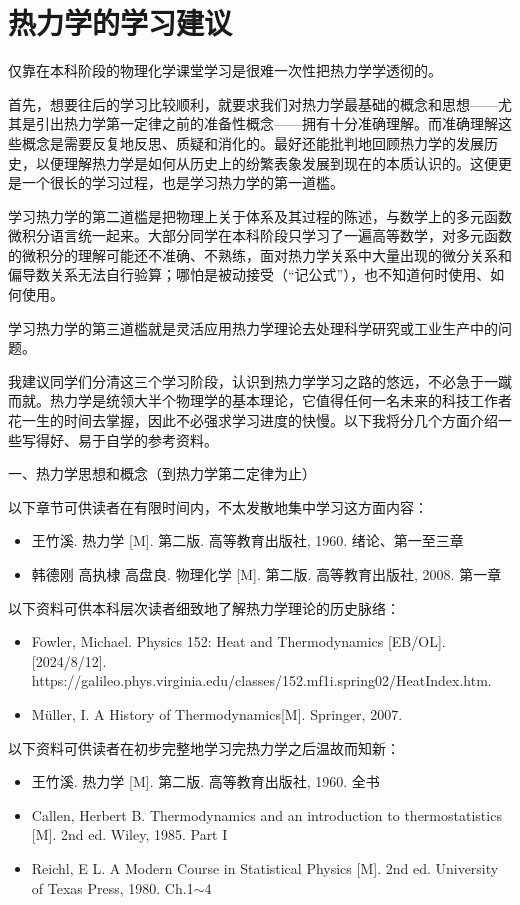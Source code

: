 \documentclass[main.tex]{subfiles}
\begin{document}
\section{热力学的学习建议}\label{I.1 learning_advices}
仅靠在本科阶段的物理化学课堂学习是很难一次性把热力学学透彻的。

首先，想要往后的学习比较顺利，就要求我们对热力学最基础的概念和思想——尤其是引出热力学第一定律之前的准备性概念——拥有十分准确理解。而准确理解这些概念是需要反复地反思、质疑和消化的。最好还能批判地回顾热力学的发展历史，以便理解热力学是如何从历史上的纷繁表象发展到现在的本质认识的。这便更是一个很长的学习过程，也是学习热力学的第一道槛。

学习热力学的第二道槛是把物理上关于体系及其过程的陈述，与数学上的多元函数微积分语言统一起来。大部分同学在本科阶段只学习了一遍高等数学，对多元函数的微积分的理解可能还不准确、不熟练，面对热力学关系中大量出现的微分关系和偏导数关系无法自行验算；哪怕是被动接受（“记公式”），也不知道何时使用、如何使用。

学习热力学的第三道槛就是灵活应用热力学理论去处理科学研究或工业生产中的问题。

我建议同学们分清这三个学习阶段，认识到热力学学习之路的悠远，不必急于一蹴而就。热力学是统领大半个物理学的基本理论，它值得任何一名未来的科技工作者花一生的时间去掌握，因此不必强求学习进度的快慢。以下我将分几个方面介绍一些写得好、易于自学的参考资料。

一、热力学思想和概念（到热力学第二定律为止）

以下章节可供读者在有限时间内，不太发散地集中学习这方面内容：
\begin{itemize}
  \item 王竹溪. 热力学 [M]. 第二版. 高等教育出版社, 1960. 绪论、第一至三章
  \item 韩德刚 高执棣 高盘良. 物理化学 [M]. 第二版. 高等教育出版社, 2008. 第一章
\end{itemize}
以下资料可供本科层次读者细致地了解热力学理论的历史脉络：
\begin{itemize}
  \item Fowler, Michael. Physics 152: Heat and Thermodynamics [EB/OL]. [2024/8/12]. \\https://galileo.phys.virginia.edu/classes/152.mf1i.spring02/HeatIndex.htm.
  \item Müller, I. A History of Thermodynamics[M]. Springer, 2007.
\end{itemize}
以下资料可供读者在初步完整地学习完热力学之后温故而知新：
\begin{itemize}
  \item 王竹溪. 热力学 [M]. 第二版. 高等教育出版社, 1960. 全书
  \item Callen, Herbert B. Thermodynamics and an introduction to thermostatistics [M]. 2nd ed. Wiley, 1985. Part I
  \item Reichl, E L. A Modern Course in Statistical Physics [M]. 2nd ed. University of Texas Press, 1980. Ch.1$\sim$4
\end{itemize}
\end{document}
